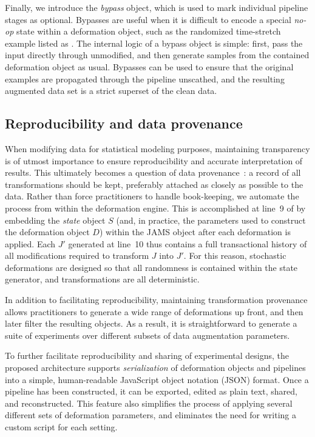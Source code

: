 \documentclass{article}
\begin{document}
Finally, we introduce the \emph{bypass} object, which is used to mark
individual pipeline stages as optional.
Bypasses are useful when it is difficult to encode a special \emph{no-op} 
state within a deformation object, such as the randomized time-stretch 
example listed as .
The internal logic of a bypass object is simple: first, pass the input directly through
unmodified, and then generate samples from the contained deformation object as usual.
Bypasses can be used to ensure that the original examples are propagated through the
pipeline unscathed, and the resulting augmented data set is a strict superset of the
clean data.

\subsection{Reproducibility and data provenance}
\label{sec:reproducibility}
When modifying data for statistical modeling purposes, maintaining transparency is of
utmost importance to ensure reproducibility and accurate interpretation of results.
This ultimately becomes a question of data provenance~\cite{buneman2000data}: a record of
all transformations should be kept, preferably attached as closely as possible to the data.
Rather than force practitioners to handle book-keeping, we automate the process from within
the deformation engine.
This is accomplished at line~9 of  by embedding the
\emph{state} object $S$ (and, in practice, the parameters used to construct the
deformation object $D$) within the JAMS object after each deformation is applied.
Each $J'$ generated at line~10 thus contains a full transactional history of all
modifications required to transform $J$ into $J'$.
For this reason, stochastic deformations are designed so that all randomness is contained
within the state generator, and transformations are all deterministic.

In addition to facilitating reproducibility, maintaining transformation provenance allows
practitioners to generate a wide range of deformations up front, and then later filter the
resulting objects.  As a result, it is straightforward to generate a suite of experiments
over different subsets of data augmentation parameters.

To further facilitate reproducibility and sharing of experimental designs, the proposed
architecture supports \emph{serialization} of deformation objects and pipelines into a 
simple, human-readable JavaScript object notation (JSON) format.
Once a pipeline has been constructed, it can be exported, edited as plain text, shared,
and reconstructed.  This feature also simplifies the
process of applying several different sets of deformation parameters, and eliminates the
need for writing a custom script for each setting.
\end{document}
